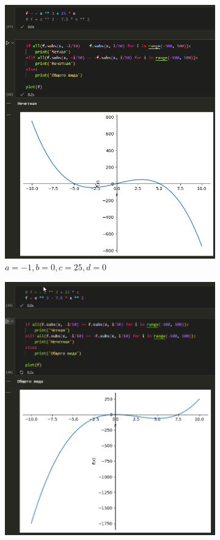 \documentclass[14pt,a4paper]{extarticle}
\begin{document}
\begin{figure}[!ht]
    \centering
    \begin{subfigure}{.5\textwidth}
        \centering
        \includegraphics[width=0.9\linewidth]{figures/1.2-cb1.png}
        \caption{$a=-1,b=0,c=25,d=0$}
        \label{fig:1.2-cb1}
    \end{subfigure}%
    \begin{subfigure}{.5\textwidth}
        \centering
        \includegraphics[width=0.9\linewidth]{figures/1.2-cb2.png}

\end{subfigure}
\end{figure}
\end{document}

